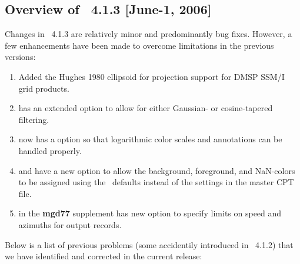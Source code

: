 \subsection{Overview of \gmt\ 4.1.3 [June-1, 2006]}

Changes in \GMT\ 4.1.3 are relatively minor and predominantly bug fixes.  However, a few enhancements
have been made to overcome limitations in the previous versions:

\begin{enumerate}
\item Added the Hughes 1980 ellipsoid for projection support for DMSP SSM/I grid products.
\item {} has an extended  option to allow for either Gaussian- or
cosine-tapered filtering.
\item {} now has a  option so that logarithmic color scales and annotations
can be handled properly.
\item {} and  have a new  option to allow the background, foreground, and
NaN-colors to be assigned using the \GMT\ defaults instead of the settings in the master CPT file. 
\item {} in the {\bf mgd77} supplement has new option  to specify limits on
speed and azimuths for output records.
\end{enumerate}

Below is a list of previous problems (some accidentily introduced in \gmt\ 4.1.2)
that we have identified and corrected in the current release:

